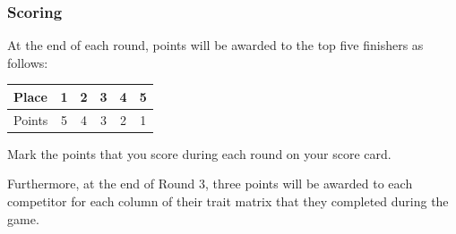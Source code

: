 \documentclass[a6paper, 11pt, parskip=half, DIV=15]{scrartcl}
\begin{document}
\subsubsection*{Scoring}
At the end of each round, points will be awarded to the top five finishers as follows:

\begin{center}
\begin{tabular}{lccccc}\toprule
Place & 1 & 2 & 3 & 4 & 5 \\\midrule
Points & 5 & 4 & 3 & 2 & 1\\\bottomrule
\end{tabular}
\end{center}

Mark the points that you score during each round on your score card.

Furthermore, at the end of Round 3, three points will be awarded to each competitor for each column of their trait matrix that they completed during the game. 
\end{document}
